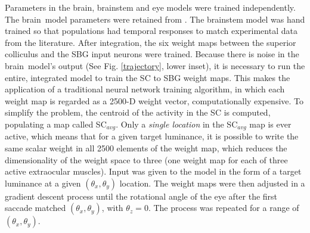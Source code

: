 \documentclass[11pt, a4paper]{article}
\newcommand{\brain}{brain}
\newcommand{\e}{\emph}
\newcommand{\mycite}[1]{\cite{#1}}
\begin{document}
Parameters in the brain, brainstem and eye models were trained
independently. The \brain~model parameters were retained from
\mycite{alex_cope_integrative_2015}. The brainstem model
was hand trained so that populations had temporal responses to match
experimental data from the literature. After integration, the six
weight maps between the superior colliculus and the SBG input neurons
were trained.
Because there is noise in the \brain~model's output (See
Fig. \ref{trajectory}, lower inset), it is necessary to run the
entire, integrated model to train the SC to SBG weight maps. This
makes the application of a traditional neural network training
algorithm, in which each weight map is regarded as a 2500-D weight
vector, computationally expensive.
To simplify the problem, the centroid of the activity in the SC is
computed, populating a map called SC$_{avg}$. Only a \e{single
location} in the SC$_{avg}$ map is ever active, which means that for a
given target luminance, it is possible to write the same scalar weight
in all 2500 elements of the weight map, which reduces the
dimensionality of the weight space to three (one weight map for each
of three active extraocular muscles).  Input was given to the model in
the form of a target luminance at a given $(\theta_{x},\theta_{y})$
location. The weight maps were then adjusted in a gradient descent
process until the rotational angle of the eye after the first saccade
matched $(\theta_{x},\theta_{y})$, with $\theta_{z}=0$. The process
was repeated for a range of $(\theta_{x},\theta_{y})$.
\end{document}
